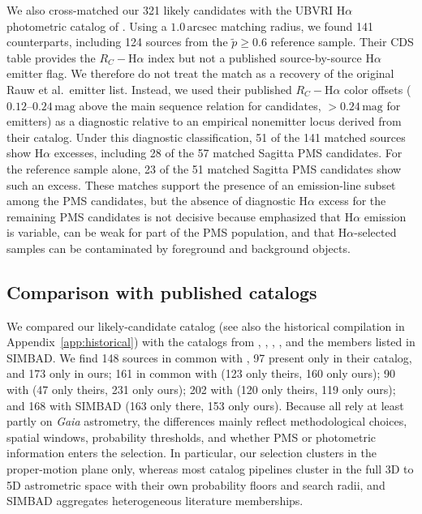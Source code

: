 \documentclass{aa}
\begin{document}
We also cross-matched our 321 likely candidates with the UBVRI H$\alpha$ photometric catalog of \citet{2010AA...511A..25R}. Using a $1.0\,\mathrm{arcsec}$ matching radius, we found 141 counterparts, including 124 sources from the $\tilde{p}\geq0.6$ reference sample. Their CDS table provides the $R_C-$H$\alpha$ index but not a published source-by-source H$\alpha$ emitter flag. We therefore do not treat the match as a recovery of the original Rauw et al.\ emitter list. Instead, we used their published $R_C-$H$\alpha$ color offsets ($0.12$--$0.24\,\mathrm{mag}$ above the main sequence relation for candidates, $>0.24\,\mathrm{mag}$ for emitters) as a diagnostic relative to an empirical nonemitter locus derived from their catalog. Under this diagnostic classification, 51 of the 141 matched sources show H$\alpha$ excesses, including 28 of the 57 matched Sagitta PMS candidates. For the reference sample alone, 23 of the 51 matched Sagitta PMS candidates show such an excess. These matches support the presence of an emission-line subset among the PMS candidates, but the absence of diagnostic H$\alpha$ excess for the remaining PMS candidates is not decisive because \citet{2010AA...511A..25R} emphasized that H$\alpha$ emission is variable, can be weak for part of the PMS population, and that H$\alpha$-selected samples can be contaminated by foreground and background objects.

\subsection{Comparison with published catalogs}
We compared our likely-candidate catalog (see also the historical compilation in Appendix~\ref{app:historical}) with the catalogs from \citet{2020AA...640A...1C}, \citet{2021ApJ...923..129J}, \citet{2022ApJS..262....7H}, \citet{2024arXiv240305143H}, and the members listed in SIMBAD\@. We find 148 sources in common with \citet{2020AA...640A...1C}, 97 present only in their catalog, and 173 only in ours; 161 in common with \citet{2021ApJ...923..129J} (123 only theirs, 160 only ours); 90 with \citet{2022ApJS..262....7H} (47 only theirs, 231 only ours); 202 with \citet{2024arXiv240305143H} (120 only theirs, 119 only ours); and 168 with SIMBAD (163 only there, 153 only ours). Because all rely at least partly on \textit{Gaia} astrometry, the differences mainly reflect methodological choices, spatial windows, probability thresholds, and whether PMS or photometric information enters the selection. In particular, our selection clusters in the proper-motion plane only, whereas most catalog pipelines cluster in the full 3D to 5D astrometric space with their own probability floors and search radii, and SIMBAD aggregates heterogeneous literature memberships.
\end{document}
